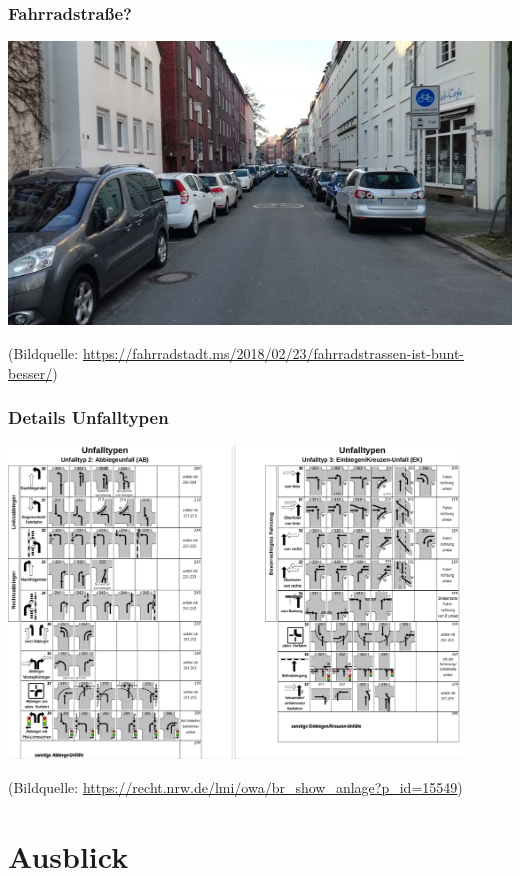 \documentclass{beamer}
\begin{document}
\begin{frame}
  \frametitle{Fahrradstraße?}
  
  \includegraphics[width=\textwidth]{img/schillerstrasse.jpg}
  
    {\scriptsize (Bildquelle: \url{https://fahrradstadt.ms/2018/02/23/fahrradstrassen-ist-bunt-besser/})\par}
\end{frame}

\begin{frame}
  \frametitle{Details Unfalltypen}
  \centering
  
  \includegraphics[width=0.9\textwidth]{img/unfalltyp-details.png}
  
  {\scriptsize (Bildquelle: \url{https://recht.nrw.de/lmi/owa/br_show_anlage?p_id=15549})\par}
\end{frame}

\section{Ausblick}
\end{document}
